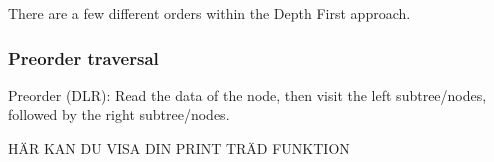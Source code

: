 \documentclass[a4paper, 11pt]{article}
\begin{document}
    There are a few different orders within the Depth First approach. 
    
    
    \subsubsection*{Preorder traversal}
    
    Preorder (DLR): Read the data of the node, then visit the left
    subtree/nodes, followed by the right subtree/nodes.

    HÄR KAN DU VISA DIN PRINT TRÄD FUNKTION



\end{document}
